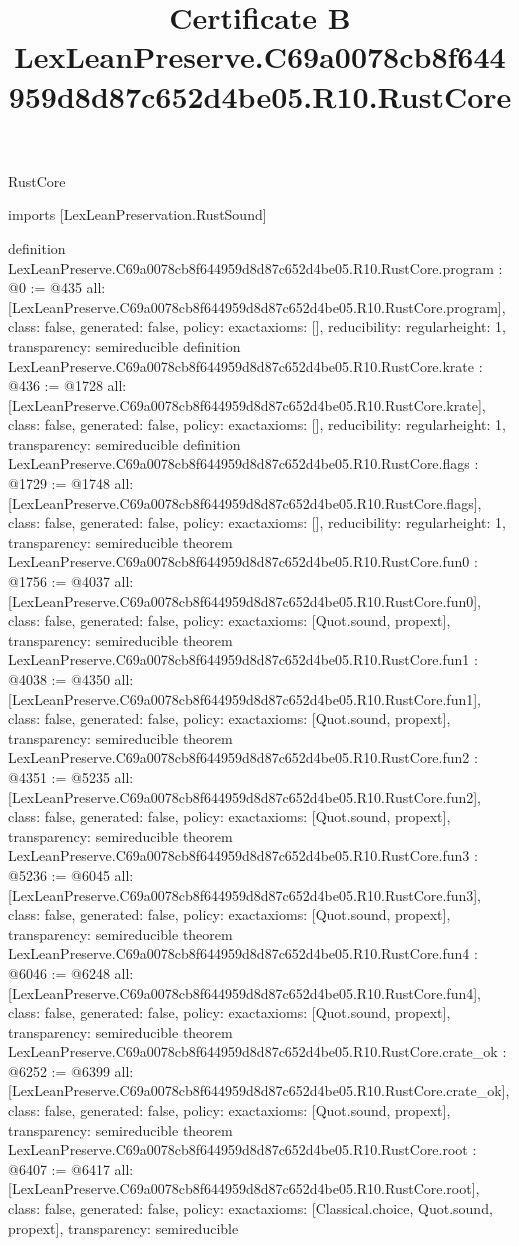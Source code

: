 \begin{lexlean}{RustCore}
\title{Certificate B LexLeanPreserve.C69a0078cb8f644959d8d87c652d4be05.R10.RustCore}
\begin{coremodule}
imports [LexLeanPreservation.RustSound]

definition LexLeanPreserve.C69a0078cb8f644959d8d87c652d4be05.R10.RustCore.program : @0 := @435 {
  all: [LexLeanPreserve.C69a0078cb8f644959d8d87c652d4be05.R10.RustCore.program],
  class: false,
  generated: false,
  policy: exact{axioms: []},
  reducibility: regular{height: 1},
  transparency: semireducible
}
definition LexLeanPreserve.C69a0078cb8f644959d8d87c652d4be05.R10.RustCore.krate : @436 := @1728 {
  all: [LexLeanPreserve.C69a0078cb8f644959d8d87c652d4be05.R10.RustCore.krate],
  class: false,
  generated: false,
  policy: exact{axioms: []},
  reducibility: regular{height: 1},
  transparency: semireducible
}
definition LexLeanPreserve.C69a0078cb8f644959d8d87c652d4be05.R10.RustCore.flags : @1729 := @1748 {
  all: [LexLeanPreserve.C69a0078cb8f644959d8d87c652d4be05.R10.RustCore.flags],
  class: false,
  generated: false,
  policy: exact{axioms: []},
  reducibility: regular{height: 1},
  transparency: semireducible
}
theorem LexLeanPreserve.C69a0078cb8f644959d8d87c652d4be05.R10.RustCore.fun0 : @1756 := @4037 {
  all: [LexLeanPreserve.C69a0078cb8f644959d8d87c652d4be05.R10.RustCore.fun0],
  class: false,
  generated: false,
  policy: exact{axioms: [Quot.sound, propext]},
  transparency: semireducible
}
theorem LexLeanPreserve.C69a0078cb8f644959d8d87c652d4be05.R10.RustCore.fun1 : @4038 := @4350 {
  all: [LexLeanPreserve.C69a0078cb8f644959d8d87c652d4be05.R10.RustCore.fun1],
  class: false,
  generated: false,
  policy: exact{axioms: [Quot.sound, propext]},
  transparency: semireducible
}
theorem LexLeanPreserve.C69a0078cb8f644959d8d87c652d4be05.R10.RustCore.fun2 : @4351 := @5235 {
  all: [LexLeanPreserve.C69a0078cb8f644959d8d87c652d4be05.R10.RustCore.fun2],
  class: false,
  generated: false,
  policy: exact{axioms: [Quot.sound, propext]},
  transparency: semireducible
}
theorem LexLeanPreserve.C69a0078cb8f644959d8d87c652d4be05.R10.RustCore.fun3 : @5236 := @6045 {
  all: [LexLeanPreserve.C69a0078cb8f644959d8d87c652d4be05.R10.RustCore.fun3],
  class: false,
  generated: false,
  policy: exact{axioms: [Quot.sound, propext]},
  transparency: semireducible
}
theorem LexLeanPreserve.C69a0078cb8f644959d8d87c652d4be05.R10.RustCore.fun4 : @6046 := @6248 {
  all: [LexLeanPreserve.C69a0078cb8f644959d8d87c652d4be05.R10.RustCore.fun4],
  class: false,
  generated: false,
  policy: exact{axioms: [Quot.sound, propext]},
  transparency: semireducible
}
theorem LexLeanPreserve.C69a0078cb8f644959d8d87c652d4be05.R10.RustCore.crate_ok : @6252 := @6399 {
  all: [LexLeanPreserve.C69a0078cb8f644959d8d87c652d4be05.R10.RustCore.crate_ok],
  class: false,
  generated: false,
  policy: exact{axioms: [Quot.sound, propext]},
  transparency: semireducible
}
theorem LexLeanPreserve.C69a0078cb8f644959d8d87c652d4be05.R10.RustCore.root : @6407 := @6417 {
  all: [LexLeanPreserve.C69a0078cb8f644959d8d87c652d4be05.R10.RustCore.root],
  class: false,
  generated: false,
  policy: exact{axioms: [Classical.choice, Quot.sound, propext]},
  transparency: semireducible
}


\end{coremodule}
\end{lexlean}

